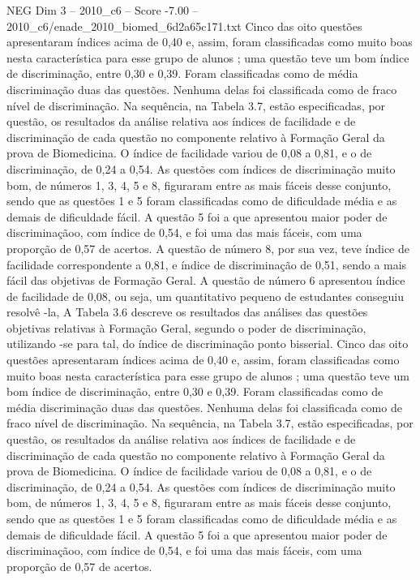\begin{textsample}{NEG Dim 3 – 2010\_c6 – Score -7.00 – 2010\_c6/enade\_2010\_biomed\_6d2a65c171.txt}
Cinco das oito questões apresentaram índices acima de 0,40 e, assim, foram classificadas como muito boas nesta característica para esse grupo de alunos ; uma questão teve um bom índice de discriminação, entre 0,30 e 0,39.
Foram classificadas como de média discriminação duas das questões.
Nenhuma delas foi classificada como de fraco nível de discriminação.
Na sequência, na Tabela 3.7, estão especificadas, por questão, os resultados da análise relativa aos índices de facilidade e de discriminação de cada questão no componente relativo à Formação Geral da prova de Biomedicina.
O índice de facilidade variou de 0,08 a 0,81, e o de discriminação, de 0,24 a 0,54.
As questões com índices de discriminação muito bom, de números 1, 3, 4, 5 e 8, figuraram entre as mais fáceis desse conjunto, sendo que as questões 1 e 5 foram classificadas como de dificuldade média e as demais de dificuldade fácil.
A questão 5 foi a que apresentou maior poder de discriminaçãoo, com índice de 0,54, e foi uma das mais fáceis, com uma proporção de 0,57 de acertos.
A questão de número 8, por sua vez, teve índice de facilidade correspondente a 0,81, e índice de discriminação de 0,51, sendo a mais fácil das objetivas de Formação Geral.
A questão de número 6 apresentou índice de facilidade de 0,08, ou seja, um quantitativo pequeno de estudantes conseguiu resolvê -la, A Tabela 3.6 descreve os resultados das análises das questões objetivas relativas à Formação Geral, segundo o poder de discriminação, utilizando -se para tal, do índice de discriminação ponto bisserial.
Cinco das oito questões apresentaram índices acima de 0,40 e, assim, foram classificadas como muito boas nesta característica para esse grupo de alunos ; uma questão teve um bom índice de discriminação, entre 0,30 e 0,39.
Foram classificadas como de média discriminação duas das questões.
Nenhuma delas foi classificada como de fraco nível de discriminação.
Na sequência, na Tabela 3.7, estão especificadas, por questão, os resultados da análise relativa aos índices de facilidade e de discriminação de cada questão no componente relativo à Formação Geral da prova de Biomedicina.
O índice de facilidade variou de 0,08 a 0,81, e o de discriminação, de 0,24 a 0,54.
As questões com índices de discriminação muito bom, de números 1, 3, 4, 5 e 8, figuraram entre as mais fáceis desse conjunto, sendo que as questões 1 e 5 foram classificadas como de dificuldade média e as demais de dificuldade fácil.
A questão 5 foi a que apresentou maior poder de discriminaçãoo, com índice de 0,54, e foi uma das mais fáceis, com uma proporção de 0,57 de acertos.

\end{textsample}
